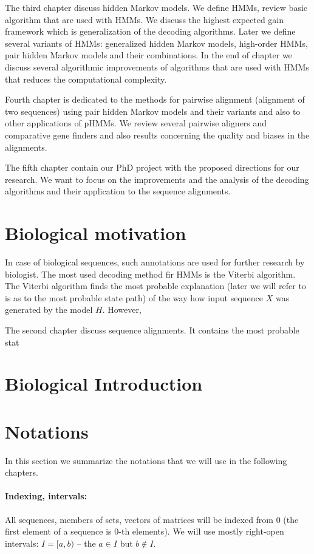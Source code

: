 The third chapter discuss hidden Markov models. We define HMMs, review basic
algorithm that are used with HMMs. We discuss the highest expected gain
framework which is generalization of the decoding algorithms. Later we define
several variants of HMMs: generalized hidden Markov models, high-order HMMs,
pair hidden Markov models and their combinations. In the end of chapter we
discuss several algorithmic improvements of algorithms that are used with HMMs
that reduces the computational complexity.

Fourth chapter is dedicated to the methods for pairwise alignment (alignment of
two sequences) using pair hidden Markov models and their variants and also to
other applications of pHMMs. We review several pairwise aligners and comparative
gene finders and also results concerning the quality and biases in the
alignments.

The fifth chapter contain our PhD project with the proposed directions for our
research. We want to focus on the improvements and the analysis of the decoding
algorithms and their application to the sequence alignments. 

\section{Biological motivation}


In case of biological
sequences, such annotations are used for further research by biologist.
The most used decoding method fir HMMs is the Viterbi algorithm. The Viterbi
algorithm finds the most probable explanation (later we will refer to is as to
the most probable state path) of the way how input sequence $X$ was generated by
the model $H$. However, 

The second chapter discuss sequence alignments. It contains the most probable
stat

\section{Biological Introduction}

\section{Notations}

In this section we summarize the notations that we will use in the following
chapters.

\paragraph{Indexing, intervals:} All sequences, members of sets, vectors of
matrices will be indexed from $0$ (the first element of a sequence is $0$-th
elements). We will use mostly right-open intervals: $I=[a,b)$ -- the $a\in I$
but $b\notin I$. 

